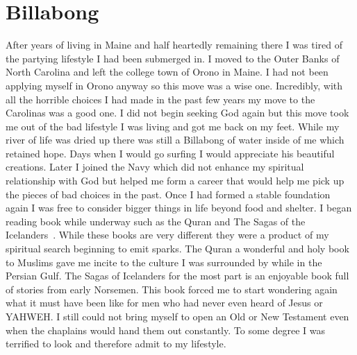 \documentclass[11pt,a4paper]{scrartcl} %
\begin{document}
\section{Billabong}
\begin{doublespace}
After years of living in Maine and half heartedly remaining there I was tired of the partying lifestyle I had been submerged in. I moved to the Outer Banks of North Carolina and left the college town of Orono in Maine. I had not been applying myself in Orono anyway so this move was a wise one. Incredibly, with all the horrible choices I had made in the past few years my move to the Carolinas was a good one. I did not begin seeking God again but this move took me out of the bad lifestyle I was living and got me back on my feet. While my river of life was dried up there was still a Billabong of water inside of me which retained hope. Days when I would go surfing I would appreciate his beautiful creations. Later I joined the Navy which did not enhance my spiritual relationship with God but helped me form a career that would help me pick up the pieces of bad choices in the past. Once I had formed a stable foundation again I was free to consider bigger things in life beyond food and shelter. I began reading book while underway such as the Quran and The Sagas of the Icelanders~\cite{Viking}. While these books are very different they were a product of my spiritual search beginning to emit sparks. The Quran a wonderful and holy book to Muslims gave me incite to the culture I was surrounded by while in the Persian Gulf. The Sagas of Icelanders for the most part is an enjoyable book full of stories from early Norsemen. This book forced me to start wondering again what it must have been like for men who had never even heard of Jesus or YAHWEH. I still could not bring myself to open an Old or New Testament even when the chaplains would hand them out constantly. To some degree I was terrified to look and therefore admit to my lifestyle. 
\end{doublespace}
\end{document}
